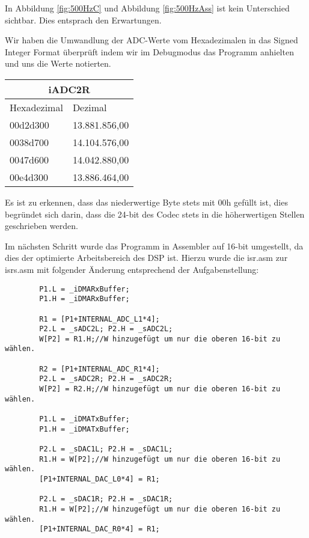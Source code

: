 In Abbildung \ref{fig:500HzC} und Abbildung \ref{fig:500HzAss} ist kein Unterschied sichtbar. Dies entsprach den 
Erwartungen.\pagebreak

Wir haben die Umwandlung der ADC-Werte vom Hexadezimalen in das Signed Integer Format überprüft indem wir im Debugmodus das Programm anhielten und uns die Werte notierten.

\begin{center}
    \begin{tabular}{ | l | l | }\hline
      \multicolumn{2}{|c|}{iADC2R}\\
    \hline
    Hexadezimal & Dezimal \\ \hline
    00d2d300 &	13.881.856,00 \\ \hline
    0038d700 &	14.104.576,00 \\ \hline
    0047d600 &	14.042.880,00 \\ \hline
    00e4d300 &	13.886.464,00 \\ 
    \hline
    \end{tabular}
\end{center}
Es ist zu erkennen, dass das niederwertige Byte stets mit 00h gefüllt ist, 
dies begründet sich darin, dass die 24-bit des Codec stets in die höherwertigen Stellen geschrieben werden.

Im nächsten Schritt wurde das Programm in Assembler auf 16-bit umgestellt, da dies der optimierte Arbeitsbereich des DSP ist.
Hierzu wurde die isr.asm zur isr\textunderscore s.asm mit folgender Änderung entsprechend der 
Aufgabenstellung:\\
 \begin{lstlisting}
        P1.L = _iDMARxBuffer; 
        P1.H = _iDMARxBuffer;

        R1 = [P1+INTERNAL_ADC_L1*4];
        P2.L = _sADC2L; P2.H = _sADC2L;
        W[P2] = R1.H;//W hinzugefügt um nur die oberen 16-bit zu wählen.
        
        R2 = [P1+INTERNAL_ADC_R1*4];
        P2.L = _sADC2R; P2.H = _sADC2R;
        W[P2] = R2.H;//W hinzugefügt um nur die oberen 16-bit zu wählen.

        P1.L = _iDMATxBuffer; 
        P1.H = _iDMATxBuffer;

        P2.L = _sDAC1L; P2.H = _sDAC1L;
        R1.H = W[P2];//W hinzugefügt um nur die oberen 16-bit zu wählen.
        [P1+INTERNAL_DAC_L0*4] = R1;
        
        P2.L = _sDAC1R; P2.H = _sDAC1R;
        R1.H = W[P2];//W hinzugefügt um nur die oberen 16-bit zu wählen.
        [P1+INTERNAL_DAC_R0*4] = R1;
 \end{lstlisting}\pagebreak

